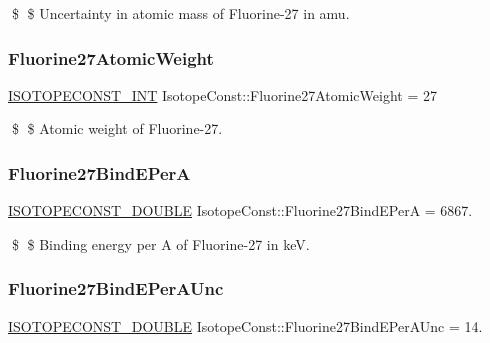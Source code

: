 \$ \$ Uncertainty in atomic mass of Fluorine-\/27 in amu. \mbox{\label{group___isotope_const-_fluorine-_f27_ga187bf53bf3e043dcfc847fae285d4d22}} 
\subsubsection{\texorpdfstring{Fluorine27\+Atomic\+Weight}{Fluorine27AtomicWeight}}
{\footnotesize\ttfamily \mbox{\hyperlink{group___isotope_const-_macros_ga5f18360b3e99483a35c32d789e62621c}{I\+S\+O\+T\+O\+P\+E\+C\+O\+N\+S\+T\+\_\+\+I\+NT}} Isotope\+Const\+::\+Fluorine27\+Atomic\+Weight = 27}

\$ \$ Atomic weight of Fluorine-\/27. \mbox{\label{group___isotope_const-_fluorine-_f27_ga563c40f3b9cd9df95759715b6acf1a6e}} 
\subsubsection{\texorpdfstring{Fluorine27\+Bind\+E\+PerA}{Fluorine27BindEPerA}}
{\footnotesize\ttfamily \mbox{\hyperlink{group___isotope_const-_macros_ga8f45a7272ce02c0b4c65c44636ed719a}{I\+S\+O\+T\+O\+P\+E\+C\+O\+N\+S\+T\+\_\+\+D\+O\+U\+B\+LE}} Isotope\+Const\+::\+Fluorine27\+Bind\+E\+PerA = 6867.}

\$ \$ Binding energy per A of Fluorine-\/27 in keV. \mbox{\label{group___isotope_const-_fluorine-_f27_gaf4f17d4725138f7acff3a97abe83b34f}} 
\subsubsection{\texorpdfstring{Fluorine27\+Bind\+E\+Per\+A\+Unc}{Fluorine27BindEPerAUnc}}
{\footnotesize\ttfamily \mbox{\hyperlink{group___isotope_const-_macros_ga8f45a7272ce02c0b4c65c44636ed719a}{I\+S\+O\+T\+O\+P\+E\+C\+O\+N\+S\+T\+\_\+\+D\+O\+U\+B\+LE}} Isotope\+Const\+::\+Fluorine27\+Bind\+E\+Per\+A\+Unc = 14.}

